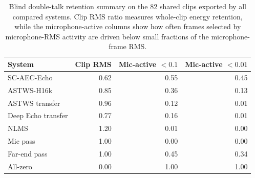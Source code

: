 \begin{table}[t]
\caption{Blind double-talk retention summary on the 82 shared clips exported by all compared systems. Clip RMS ratio measures whole-clip energy retention, while the microphone-active columns show how often frames selected by microphone-RMS activity are driven below small fractions of the microphone-frame RMS.}
\label{tab:blind-retention}
\centering
\scriptsize
\begin{tabular}{lrrr}
\hline
System & Clip RMS & Mic-active $<0.1$ & Mic-active $<0.01$ \\
\hline
SC-AEC-Echo & 0.62 & 0.55 & 0.45 \\
ASTWS-H16k & 0.85 & 0.36 & 0.13 \\
ASTWS transfer & 0.96 & 0.12 & 0.01 \\
Deep Echo transfer & 0.77 & 0.16 & 0.01 \\
NLMS & 1.20 & 0.01 & 0.00 \\
Mic pass & 1.00 & 0.00 & 0.00 \\
Far-end pass & 1.00 & 0.45 & 0.34 \\
All-zero & 0.00 & 1.00 & 1.00 \\
\hline
\end{tabular}
\end{table}

